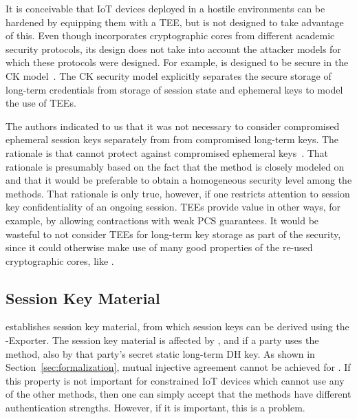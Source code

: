 \documentclass[runningheads, envcountsame, hidelinks, a4paper, x11names]{llncs}
\begin{document}
It is conceivable that IoT devices deployed in a hostile environments can be
hardened by equipping them with a TEE, but \mEdhoc{} is not %
designed to take advantage of this.
%
Even though \mEdhoc{} incorporates cryptographic cores from different academic
security protocols, its design does not take into account the attacker models
for which these protocols were designed.
%
For example, \mOptls{} is designed to be secure in the CK
model~\cite{DBLP:conf/crypto/CanettiK02}.
%
The CK security model explicitly separates the secure storage of long-term
credentials from storage of session state and ephemeral keys to model the 
use of TEEs.
%

The \mEdhoc{} authors indicated to us that it was
not necessary to consider compromised ephemeral session keys separately from
from compromised long-term keys.
%
The rationale is that \mSigma{} cannot protect against compromised ephemeral
keys~\cite{personalCommunication}.
%
That rationale is presumably based on the fact that the \mSigSig{} method is
closely modeled on \mSigmaI{} and that it would be preferable to obtain a
homogeneous security level among the \mEdhoc{}
methods.
%
That rationale is only true, however, if one restricts attention to session key
confidentiality of an ongoing session.
%
TEEs provide value in other ways, for example, by allowing contractions with
weak PCS guarantees.
%
It would be wasteful to not consider TEEs for long-term key storage as part of
the security, since it could otherwise make use of many good properties of the
re-used cryptographic cores, like \mOptls.
%
%

\subsection{Session Key Material}
\label{sec:sessionKeyMaterial}
\mEdhoc{} establishes session key material, from which session keys
can be derived using the \mEdhoc{}-Exporter.
%
The session key material is affected by \mGxy{}, and if a party uses the
\mStat{} method, also by that party's secret static long-term DH key.
%
As shown in Section~\ref{sec:formalization}, mutual injective agreement cannot
be achieved for \mGiy{}.
%
If this property is not important for constrained IoT devices which cannot use
any of the other methods, then one can simply accept that the methods have
different authentication strengths.
%
However, if it is important, this is a problem.
%
\end{document}
